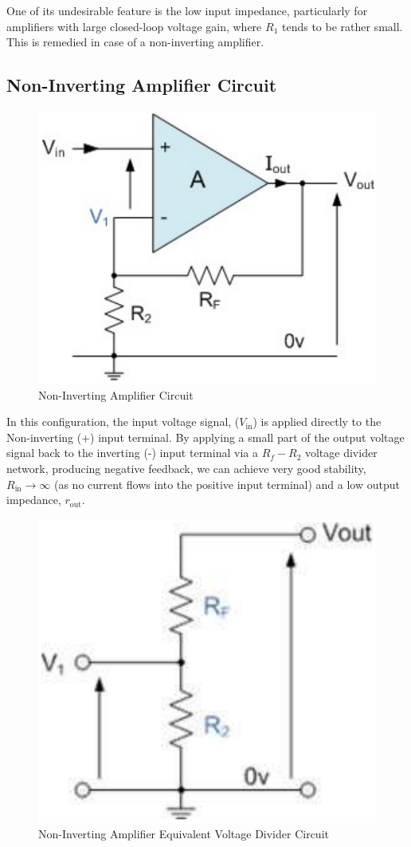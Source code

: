 One of its undesirable feature is the low input impedance, particularly for amplifiers with large closed-loop voltage gain, where $R_1$ tends to be rather small. This is remedied in case of a non-inverting amplifier. 


\subsection{Non-Inverting Amplifier Circuit}

\begin{figure}[H]
    \centering
    \includegraphics[width=0.6\columnwidth]{images/noninv1.png}
    \caption{Non-Inverting Amplifier Circuit}
    \label{noninv1}
\end{figure}

In this configuration, the input voltage signal, ($V_\text{in}$) is applied directly to the Non-inverting (+) input terminal. By applying a small part of the output voltage signal back to the inverting (-) input terminal via a $R_f - R_2$ voltage divider network, producing negative feedback, we can achieve very good stability, $R_\text{in} \rightarrow \infty$ (as no current flows into the positive input terminal) and a low output impedance, $r_\text{out}$.

\begin{figure}[H]
    \centering
    \includegraphics[width=0.45\columnwidth]{images/noninv2.png}
    \caption{Non-Inverting Amplifier Equivalent Voltage Divider Circuit}
    \label{noninv2}
\end{figure}

